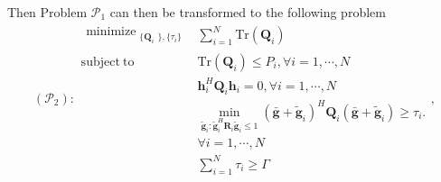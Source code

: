 \documentclass[conference]{IEEEtran}
\begin{document}
 Then Problem $\mathcal{P}_1$ can then be transformed to the following problem
 \begin{equation}\label{eq:problem3}
 (\mathcal{P}_{2}): \begin{array}{ll}
 \begin{split}
 \mathop{\text{minimize}}_{\substack{\{\mathbf{Q}_{i}}\},\{\tau_i\}} 
 \end{split}  
 & \sum_{i = 1}^{N}\mathrm{Tr}(\mathbf{Q}_i)\\
 \mathrm{subject~to} &\mathrm{Tr}(\mathbf{Q}_i) \leq P_i, \forall i = 1, \cdots, N\\
 & \mathbf{h}_i^H \mathbf{Q}_i \mathbf{h}_i= 0, \forall i = 1,\cdots,N\\
 &\min_{\tilde{\mathbf{g}}_i: \tilde{\mathbf{g}}_i^H \mathbf{R}_i\tilde{\mathbf{g}}_i \leq 1}(\bar{\mathbf{g}}+\tilde{\mathbf{g}}_i)^H\mathbf{Q}_i(\bar{\mathbf{g}}+\tilde{\mathbf{g}}_i) \geq  \tau_i. \\
 &\forall i = 1,\cdots,N \nonumber\\
 &\sum_{i =1}^{N}\tau_i \geq \Gamma
 \end{array},
 \end{equation}
\end{document}

